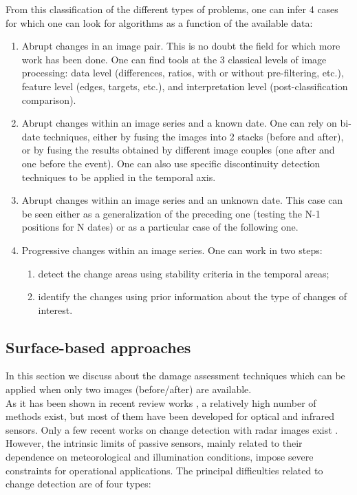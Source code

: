 From this classification of the different types of problems, one can
infer 4 cases for which one can look for algorithms as a function of
the available data:
\begin{enumerate}
\item Abrupt changes in an image pair. This is no doubt the field for
  which more work has been done. One can find tools at the 3 classical
  levels of image processing: data level (differences, ratios, with
  or without pre-filtering, etc.), feature level (edges, targets,
  etc.), and interpretation level (post-classification comparison).

\item Abrupt changes within an image series and a known date. One can
  rely on bi-date techniques, either by fusing the images into 2 stacks
  (before and after), or by fusing the results obtained by different
  image couples (one after and one before the event). One can also use
  specific discontinuity detection techniques to be applied in the
  temporal axis.

\item Abrupt changes within an image series and an unknown date. This
  case can be seen either as a generalization of the preceding one (testing
  the N-1 positions for N dates) or as a particular case of the
  following one.

\item Progressive changes within an image series. One can work in two
  steps:
  \begin{enumerate}
    \item detect the change areas using stability criteria in the
    temporal areas;
    \item identify the changes using prior information about the type
    of changes of interest.
  \end{enumerate}
  
\end{enumerate}




\subsection{Surface-based approaches}\label{secChgtAbr}
In this section we discuss about the damage assessment techniques
which can be applied when only two images (before/after) are available.\\

As it has been shown in recent review works
\cite{Coppin03,Lu04,Radke05,Richards05}, a relatively high number of
methods exist, but most of them have been developed for optical and
infrared sensors. Only a few recent works on change detection with
radar images exist
\cite{Stabel02,Bruzzone02b,Onana_2003,Inglada03,Derrode03,Bazi05,Inglada07}.
However, the intrinsic limits of passive sensors, mainly related to
their dependence on meteorological and illumination conditions, impose
severe constraints for operational applications. The principal
difficulties related to change detection are of four types:

